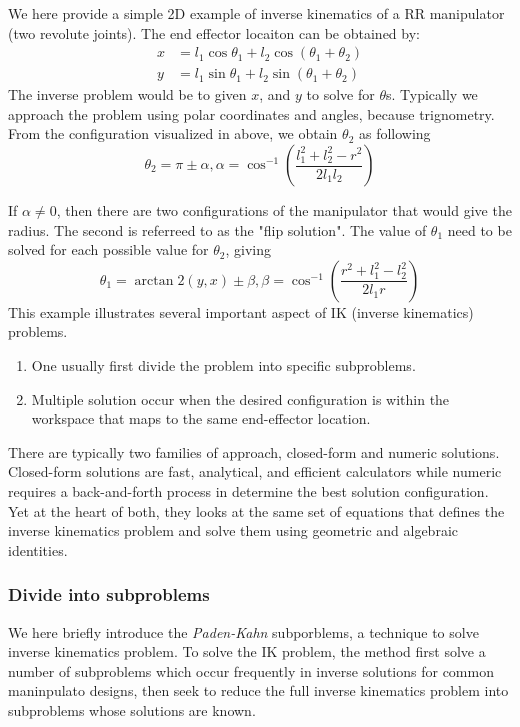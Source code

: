 \documentclass[letterpaper]{article}
\begin{document}
We here provide a simple 2D example of inverse kinematics of a RR manipulator (two revolute joints).
The end effector locaiton can be obtained by:
\begin{equation*}
  \begin{split}
    x & = l_1\cos\theta_1 + l_2\cos(\theta_1 + \theta_2)\\
    y & = l_1\sin\theta_1 + l_2\sin(\theta_1 + \theta_2)
  \end{split}
\end{equation*}
The inverse problem would be to given $x$, and $y$ to solve for $\theta$s. 
Typically we approach the problem using polar coordinates and angles, because
trignometry. From the configuration visualized in above, we obtain $\theta_2$ as following
\begin{equation*}
  \theta_2 = \pi \pm \alpha, \alpha = \cos^{-1}\left(\frac{l_1^2+l_2^2-r^2}{2l_1l_2}\right)
\end{equation*}

If $\alpha \neq 0$, then there are two configurations of the manipulator that would give the radius.
The second is referreed to as the "flip solution". The value of $\theta_1$ need to be solved
for each possible value for $\theta_2$, giving
\begin{equation*}
  \theta_1 = \arctan2(y,x) \pm \beta, \beta = \cos^{-1}\left(\frac{r^2+l_1^2-l_2^2}{2l_1r}\right)
\end{equation*}
This example illustrates several important aspect of IK (inverse kinematics) problems.
\begin{enumerate}
  \item One usually first divide the problem into specific subproblems. 
  \item Multiple solution occur when the desired configuration is within the workspace that
  maps to the same end-effector location. 
\end{enumerate}

There are typically two families of approach, closed-form and numeric solutions. 
Closed-form solutions are fast, analytical, and efficient calculators while numeric
requires a back-and-forth process in determine the best solution configuration. 
Yet at the heart of both, they looks at the same set of equations that defines the 
inverse kinematics problem and solve them using geometric and algebraic identities. 

\iffalse

\subsubsection{Divide into subproblems}
We here briefly introduce the \emph{Paden-Kahn} subporblems, a technique
to solve inverse kinematics problem. To solve the IK problem, the method first solve 
a number of subproblems which occur frequently in inverse solutions for common maninpulato
designs, then seek to reduce the full inverse kinematics problem into subproblems
whose solutions are known. 
\end{document}
